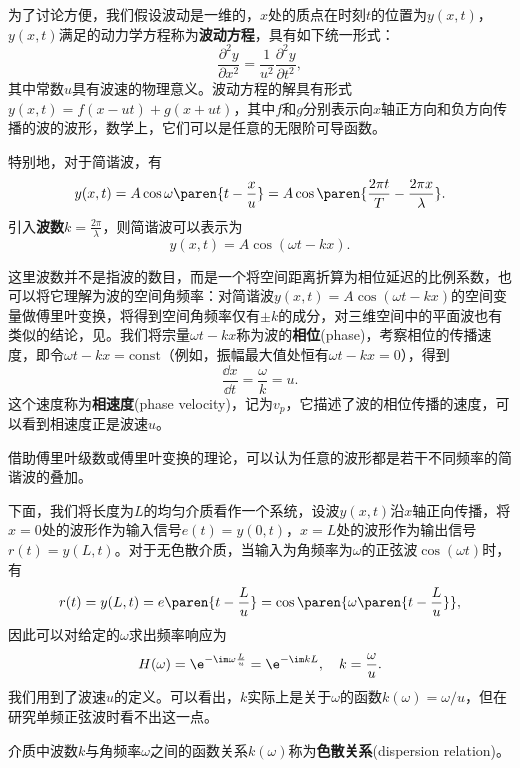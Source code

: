 为了讨论方便，我们假设波动是一维的，$x$处的质点在时刻$t$的位置为$y(x,t)$，$y(x,t)$满足的动力学方程称为\textbf{波动方程}，具有如下统一形式：
\begin{equation}
    \frac{\partial^2 y}{\partial x^2}=\frac{1}{u^2}\frac{\partial^2 y}{\partial t^2},
\end{equation}
其中常数$u$具有波速的物理意义。波动方程的解具有形式$y(x,t)=f(x-ut)+g(x+ut)$，其中$f$和$g$分别表示向$x$轴正方向和负方向传播的波的波形，数学上，它们可以是任意的无限阶可导函数。

特别地，对于简谐波，有
\begin{equation}
    y(x,t)=A\cos\omega\paren{t-\frac{x}{u}}=A\cos\paren{\frac{2\pi t}{T}-\frac{2\pi x}{\lambda}}.
\end{equation}
引入\textbf{波数}$k=\frac{2\pi}{\lambda}$，则简谐波可以表示为
\begin{equation}
    y(x,t)=A\cos(\omega t - k x).
\end{equation}

这里波数并不是指波的数目，而是一个将空间距离折算为相位延迟的比例系数，也可以将它理解为波的空间角频率：对简谐波$y(x,t)=A\cos(\omega t-kx)$的空间变量做傅里叶变换，将得到空间角频率仅有$\pm k$的成分，对三维空间中的平面波也有类似的结论，见。我们将宗量$\omega t-kx$称为波的\textbf{相位}(phase)，考察相位的传播速度，即令$\omega t-kx=\text{const}$（例如，振幅最大值处恒有$\omega t-kx=0$），得到
\begin{equation}\label{eq:phase_velocity}
    \frac{\dd x}{\dd t}=\frac{\omega}{k}=u.
\end{equation}
这个速度称为\textbf{相速度}(phase velocity)，记为$v_p$，它描述了波的相位传播的速度，可以看到相速度正是波速$u$。

借助傅里叶级数或傅里叶变换的理论，可以认为任意的波形都是若干不同频率的简谐波的叠加。

下面，我们将长度为$L$的均匀介质看作一个系统，设波$y(x,t)$沿$x$轴正向传播，将$x=0$处的波形作为输入信号$e(t)=y(0,t)$，$x=L$处的波形作为输出信号$r(t)=y(L,t)$。对于无色散介质，当输入为角频率为$\omega$的正弦波$\cos(\omega t)$时，有
\begin{equation}
    r(t)=y(L,t)=e\paren{t - \frac{L}{u}}=\cos\paren{\omega\paren{t-\frac{L}{u}}},
\end{equation}
因此可以对给定的$\omega$求出频率响应为
\begin{equation}
    H(\omega)=\e^{-\im\omega \frac{L}{u}}=\e^{-\im kL},\quad k=\frac{\omega}{u}.
\end{equation}
我们用到了波速$u$的定义。可以看出，$k$实际上是关于$\omega$的函数$k(\omega)=\omega/u$，但在研究单频正弦波时看不出这一点。
\begin{definition}[色散关系]
    介质中波数$k$与角频率$\omega$之间的函数关系$k(\omega)$称为\textbf{色散关系}(dispersion relation)。
\end{definition}

